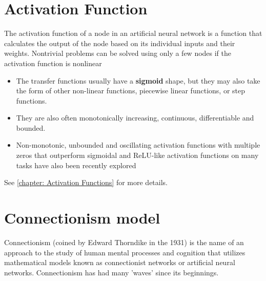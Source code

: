 \section{Activation Function \cite{wiki-Artificial_neuron, wiki-activation-fn}}
The activation function of a node in an artificial neural network is a function that calculates the output of the node based on its individual inputs and their weights. Nontrivial problems can be solved using only a few nodes if the activation function is nonlinear


\begin{itemize}
    \item  The transfer functions usually have a \textbf{sigmoid} shape, but they may also take the form of other non-linear functions, piecewise linear functions, or step functions.
    \item They are also often monotonically increasing, continuous, differentiable and bounded. 
    \item  Non-monotonic, unbounded and oscillating activation functions with multiple zeros that outperform sigmoidal and ReLU-like activation functions on many tasks have also been recently explored
\end{itemize}

See \ref{chapter: Activation Functions} for more details.


\section{Connectionism model \cite{wiki-Connectionism}}\label{Connectionism model}
Connectionism (coined by Edward Thorndike in the 1931) is the name of an approach to the study of human mental processes and cognition that utilizes mathematical models known as connectionist networks or artificial neural networks. Connectionism has had many 'waves' since its beginnings.

